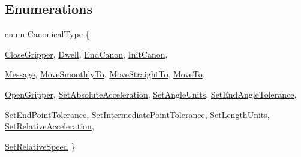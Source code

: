 \subsection*{Enumerations}
\begin{DoxyCompactItemize}
\item 
enum \hyperlink{canonical_msg_8hh_a82f10f8fe974cf1c4a8c7459b963ffeb}{CanonicalType} \{ \par
\hyperlink{canonical_msg_8hh_a82f10f8fe974cf1c4a8c7459b963ffeba7dd16522dbd7b60b5e67d30a26baa259}{CloseGripper}, 
\hyperlink{canonical_msg_8hh_a82f10f8fe974cf1c4a8c7459b963ffebaa2faf61aa0b7d9cae131827bc2cb0871}{Dwell}, 
\hyperlink{canonical_msg_8hh_a82f10f8fe974cf1c4a8c7459b963ffeba1b2f852d21439cf980720d04ff8c3bea}{EndCanon}, 
\hyperlink{canonical_msg_8hh_a82f10f8fe974cf1c4a8c7459b963ffeba6529a95f7900aa0e5863ef750309f9fa}{InitCanon}, 
\par
\hyperlink{canonical_msg_8hh_a82f10f8fe974cf1c4a8c7459b963ffeba2dfbf31ed014852927c31c352feac51f}{Message}, 
\hyperlink{canonical_msg_8hh_a82f10f8fe974cf1c4a8c7459b963ffeba54dec55208aba20b440f6358bf7b254b}{MoveSmoothlyTo}, 
\hyperlink{canonical_msg_8hh_a82f10f8fe974cf1c4a8c7459b963ffeba732fb4fe20c6b4965753f21a758655b1}{MoveStraightTo}, 
\hyperlink{canonical_msg_8hh_a82f10f8fe974cf1c4a8c7459b963ffeba820e17d26e153463c30b3f1c1c78fbcf}{MoveTo}, 
\par
\hyperlink{canonical_msg_8hh_a82f10f8fe974cf1c4a8c7459b963ffeba3547fd221d790f71cf8d86f575ca8199}{OpenGripper}, 
\hyperlink{canonical_msg_8hh_a82f10f8fe974cf1c4a8c7459b963ffeba37b3cf4d50de212f6613d640c1405ce7}{SetAbsoluteAcceleration}, 
\hyperlink{canonical_msg_8hh_a82f10f8fe974cf1c4a8c7459b963ffeba1099edc61864df22dbb0503ddfbd4a02}{SetAngleUnits}, 
\hyperlink{canonical_msg_8hh_a82f10f8fe974cf1c4a8c7459b963ffeba78d9daec5adb8ae2600d5c01c06b5d1c}{SetEndAngleTolerance}, 
\par
\hyperlink{canonical_msg_8hh_a82f10f8fe974cf1c4a8c7459b963ffeba56519e94f19ad1424030900883afe72a}{SetEndPointTolerance}, 
\hyperlink{canonical_msg_8hh_a82f10f8fe974cf1c4a8c7459b963ffeba3e4d85f3733c885e47d5514698d1bb23}{SetIntermediatePointTolerance}, 
\hyperlink{canonical_msg_8hh_a82f10f8fe974cf1c4a8c7459b963ffeba26aa6c3c639a57f2539a9574de7b9dfb}{SetLengthUnits}, 
\hyperlink{canonical_msg_8hh_a82f10f8fe974cf1c4a8c7459b963ffeba722361e3e0436abb2fa75543a59f7e15}{SetRelativeAcceleration}, 
\par
\hyperlink{canonical_msg_8hh_a82f10f8fe974cf1c4a8c7459b963ffebacb60317e00ebfefa4cb41462afd6ae5f}{SetRelativeSpeed}
 \}
\end{DoxyCompactItemize}


